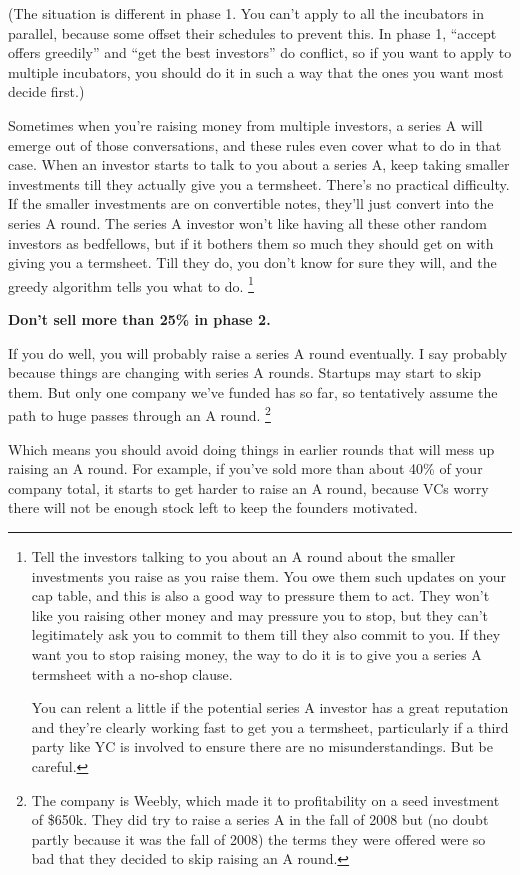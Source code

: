 (The situation is different in phase 1. You can't apply to all the
incubators in parallel, because some offset their schedules to prevent
this. In phase 1, ``accept offers greedily'' and ``get the best
investors'' do conflict, so if you want to apply to multiple incubators,
you should do it in such a way that the ones you want most decide
first.)

Sometimes when you're raising money from multiple investors, a series A
will emerge out of those conversations, and these rules even cover what
to do in that case. When an investor starts to talk to you about a
series A, keep taking smaller investments till they actually give you a
termsheet. There's no practical difficulty. If the smaller investments
are on convertible notes, they'll just convert into the series A round.
The series A investor won't like having all these other random investors
as bedfellows, but if it bothers them so much they should get on with
giving you a termsheet. Till they do, you don't know for sure they will,
and the greedy algorithm tells you what to do. \footnote{Tell the investors talking to you about an A round about the
smaller investments you raise as you raise them. You owe them such
updates on your cap table, and this is also a good way to pressure them
to act. They won't like you raising other money and may pressure you to
stop, but they can't legitimately ask you to commit to them till they
also commit to you. If they want you to stop raising money, the way to
do it is to give you a series A termsheet with a no-shop clause.

You can relent a little if the potential series A investor has a great
reputation and they're clearly working fast to get you a termsheet,
particularly if a third party like YC is involved to ensure there are no
misunderstandings. But be careful.}

\textbf{Don't sell more than 25\% in phase 2.}

If you do well, you will probably raise a series A round eventually. I
say probably because things are changing with series A rounds. Startups
may start to skip them. But only one company we've funded has so far, so
tentatively assume the path to huge passes through an A round.
\footnote{The company is Weebly, which made it to profitability on a seed
investment of \$650k. They did try to raise a series A in the fall of
2008 but (no doubt partly because it was the fall of 2008) the terms
they were offered were so bad that they decided to skip raising an A
round.}

Which means you should avoid doing things in earlier rounds that will
mess up raising an A round. For example, if you've sold more than about
40\% of your company total, it starts to get harder to raise an A round,
because VCs worry there will not be enough stock left to keep the
founders motivated.

